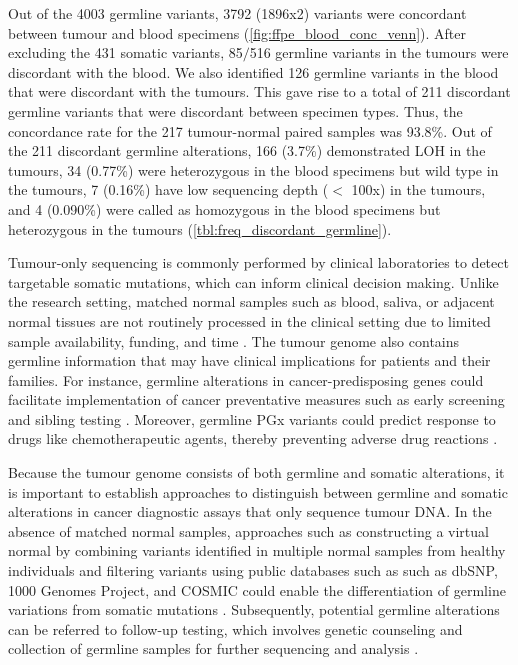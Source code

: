Out of the 4003 germline variants, 3792 (1896x2) variants were concordant between tumour and blood specimens (\autoref{fig:ffpe_blood_conc_venn}). After excluding the 431 somatic variants, 85$/$516 germline variants in the tumours were discordant with the blood. We also identified 126 germline variants in the blood that were discordant with the tumours. This gave rise to a total of 211 discordant germline variants that were discordant between specimen types. Thus, the concordance rate for the 217 tumour-normal paired samples was 93.8\%. Out of the 211 discordant germline alterations, 166 (3.7\%) demonstrated LOH in the tumours, 34 (0.77\%) were heterozygous in the blood specimens but wild type in the tumours, 7 (0.16\%) have low sequencing depth ($<$ 100x) in the tumours, and 4 (0.090\%) were called as homozygous in the blood specimens but heterozygous in the tumours (\autoref{tbl:freq_discordant_germline}).

Tumour-only sequencing is commonly performed by clinical laboratories to detect targetable somatic mutations, which can inform clinical decision making. Unlike the research setting, matched normal samples such as blood, saliva, or adjacent normal tissues are not routinely processed in the clinical setting due to limited sample availability, funding, and time \cite{Frampton2013, Fumagalli2010, Lin2014, Wong2014a}. The tumour genome also contains germline information that may have clinical implications for patients and their families. For instance, germline alterations in cancer-predisposing genes could facilitate implementation of cancer preventative measures such as early screening and sibling testing \cite{Schrader2015, Meric-Bernstam2016}. Moreover, germline PGx variants could predict response to drugs like chemotherapeutic agents, thereby preventing adverse drug reactions \cite{McLeod2013, Dai2008, Lee2014, Morel2006, VanKuilenburg2016, Etienne-Grimaldi2010, Mohelnikova-Duchonova2014, Jennings2013}.

Because the tumour genome consists of both germline and somatic alterations, it is important to establish approaches to distinguish between germline and somatic alterations in cancer diagnostic assays that only sequence tumour DNA. In the absence of matched normal samples, approaches such as constructing a virtual normal by combining variants identified in multiple normal samples from healthy individuals and filtering variants using public databases such as such as dbSNP, 1000 Genomes Project, and COSMIC could enable the differentiation of germline variations from somatic mutations \cite{Hiltemann2015, Jones2015a}. Subsequently, potential germline alterations can be referred to follow-up testing, which involves genetic counseling and collection of germline samples for further sequencing and analysis \cite{Raymond2016, Bombard2014, Green2013}.

